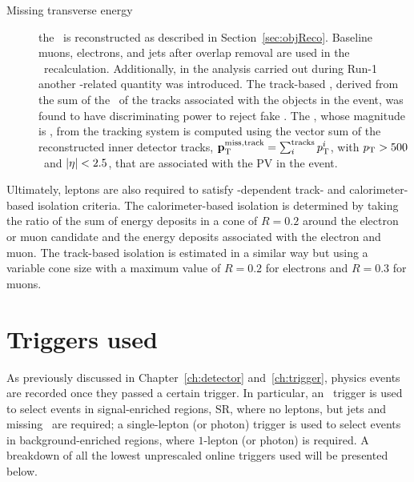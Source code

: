 \begin{description}
			\item[Missing transverse energy]
				the \met\ is reconstructed as described in Section~\ref{sec:objReco}. Baseline muons, electrons, and jets after overlap removal are used in the \met\ recalculation. 
				Additionally, in the analysis carried out during Run-1~\cite{stop0LRun1} another \met-related quantity was introduced. The track-based \met, derived from the sum of the \pt\ of the tracks associated with the objects in the event, was found to have discriminating power to reject fake \met. The \ptmisstrk, whose magnitude is \mettrk, from the tracking system is computed using the vector sum of the reconstructed inner detector tracks, $\mathbf{p}_{\mathrm{T}}^{\mathrm{miss, track}} = \sum_i^{\mathrm{tracks}} p_{\mathrm{T}}^i$, with $p_{\mathrm{T}} > 500$ \MeV\ and $|\eta| < 2.5$, that are associated with the \ac{PV} in the event. 
 		\end{description}

		Ultimately, leptons are also required to satisfy \pt-dependent track- and calorimeter-based isolation criteria. The calorimeter-based isolation is determined by taking the ratio of the sum of energy deposits in a cone of $R = 0.2$ around the electron or muon candidate and the energy deposits associated with the electron and muon. The track-based isolation is estimated in a similar way but using a variable cone size with a maximum value of $R = 0.2$ for electrons and $R = 0.3$ for muons.%

		
	\section{Triggers used}
	\label{sec:trig_used}

		As previously discussed in Chapter~\ref{ch:detector} and~\ref{ch:trigger}, physics events are recorded once they passed a certain trigger. In particular, an \met\ trigger is used to select events in signal-enriched regions, \ac{SR}, where no leptons, but jets and missing \et\ are required; a single-lepton (or photon) trigger is used to select events in background-enriched regions, where $1$-lepton (or photon) is required. A breakdown of all the lowest unprescaled online triggers used will be presented below.

